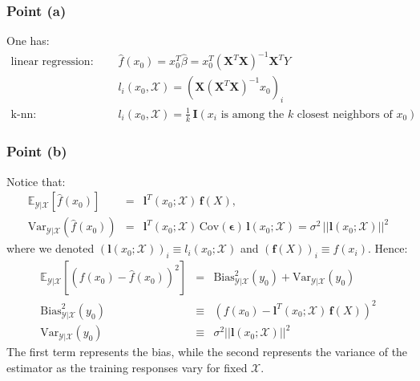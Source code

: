 

\subsubsection*{Point (a)}

One has:
\begin{eqnarray*}
    \textrm{linear regression:} \quad && \hat{f}(x_0) = x_0^T \hat{\beta} = x_0^T (\mathbf{X} ^{T} \mathbf{X}) ^{-1} \mathbf{X} ^{T} Y \\
    && l_i(x_0, \mathcal{X}) = \left( \mathbf{X} (\mathbf{X} ^{T}\mathbf{X}) ^{-1} x_0\right)_i \\
    \textrm{k-nn:} \quad && l_i(x_0, \mathcal{X}) = \frac{1}{k}\, \mathbf{I} \left( x_i \textrm{ is among the } k \textrm{ closest neighbors of } x_0 \right)
\end{eqnarray*}

\subsubsection*{Point (b)}

Notice that:
\begin{eqnarray*}
    \mathbb{E}_{\mathcal{Y}|\mathcal{X}} \left[ \hat{f}(x_0) \right] & = & \bm{l}^{T}(x_0; \mathcal{X})\,\bm{f}(X),\\
    \textrm{Var}_{\mathcal{Y}|\mathcal{X}}\left( \hat{f}(x_0) \right) & = & \bm{l}^{T}(x_0; \mathcal{X})\, \textrm{Cov}(\bm{\epsilon}) \, \bm{l}(x_0; \mathcal{X}) = \sigma^2 \, ||\bm{l}(x_0; \mathcal{X})||^2
\end{eqnarray*}
where we denoted $(\bm{l}(x_0; \mathcal{X}))_i \equiv l_i(x_0; \mathcal{X})$ and $(\bm{f}(X))_i \equiv f(x_i)$. Hence:
\begin{eqnarray*}
    \mathbb{E}_{\mathcal{Y}| \mathcal{X}} \left[ \left( f(x_0) - \hat{f}(x_0) \right)^2 \right]  & = & \textrm{Bias}^2_{\mathcal{Y}| \mathcal{X}}(y_0) + \textrm{Var}_{\mathcal{Y}| \mathcal{X}}(y_0)\\ 
    \textrm{Bias}^2_{\mathcal{Y}| \mathcal{X}}(y_0) & \equiv & \left( f(x_0) - \bm{l}^{T}(x_0; \mathcal{X})\,\bm{f}(X) \right)^2\\
    \textrm{Var}_{\mathcal{Y}| \mathcal{X}}(y_0) & \equiv & \sigma^2 ||\bm{l}(x_0; \mathcal{X})||^2 
\end{eqnarray*}
The first term represents the bias, while the second represents the variance of the estimator as the training responses vary for fixed $\mathcal{X}$.

